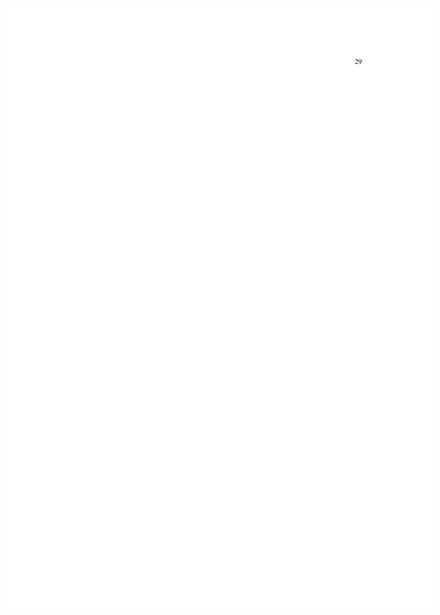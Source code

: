 \begin{figure}[p]
	\centering 
	\includegraphics[scale=0.7]{capitulos/resolucoes/cuni414/cuni414-29.pdf}
\end{figure} \pagebreak

